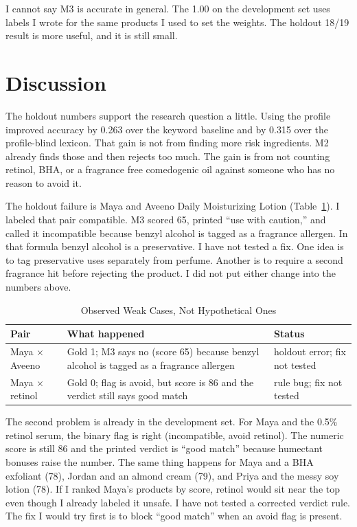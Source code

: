 \documentclass[conference]{IEEEtran}
\begin{document}
I cannot say M3 is accurate in general. The 1.00 on the development set uses labels I wrote for the same products I used to set the weights. The holdout 18/19 result is more useful, and it is still small.

\section{Discussion}
The holdout numbers support the research question a little. Using the profile improved accuracy by 0.263 over the keyword baseline and by 0.315 over the profile-blind lexicon. That gain is not from finding more risk ingredients. M2 already finds those and then rejects too much. The gain is from not counting retinol, BHA, or a fragrance free comedogenic oil against someone who has no reason to avoid it.

The holdout failure is Maya and Aveeno Daily Moisturizing Lotion (Table~\ref{tab:fail}). I labeled that pair compatible. M3 scored 65, printed ``use with caution,'' and called it incompatible because benzyl alcohol is tagged as a fragrance allergen. In that formula benzyl alcohol is a preservative. I have not tested a fix. One idea is to tag preservative uses separately from perfume. Another is to require a second fragrance hit before rejecting the product. I did not put either change into the numbers above.

\begin{table}[t]
\caption{Observed Weak Cases, Not Hypothetical Ones}
\label{tab:fail}
\centering
\scriptsize
\begin{tabular}{@{}p{2.05cm}p{3.15cm}p{2.15cm}@{}}
\toprule
Pair & What happened & Status \\
\midrule
Maya $\times$ Aveeno & Gold 1; M3 says no (score 65) because benzyl alcohol is tagged as a fragrance allergen & holdout error; fix not tested \\
Maya $\times$ retinol & Gold 0; flag is avoid, but score is 86 and the verdict still says good match & rule bug; fix not tested \\
\bottomrule
\end{tabular}
\end{table}

The second problem is already in the development set. For Maya and the 0.5\% retinol serum, the binary flag is right (incompatible, avoid retinol). The numeric score is still 86 and the printed verdict is ``good match'' because humectant bonuses raise the number. The same thing happens for Maya and a BHA exfoliant (78), Jordan and an almond cream (79), and Priya and the messy soy lotion (78). If I ranked Maya's products by score, retinol would sit near the top even though I already labeled it unsafe. I have not tested a corrected verdict rule. The fix I would try first is to block ``good match'' when an avoid flag is present.
\end{document}

